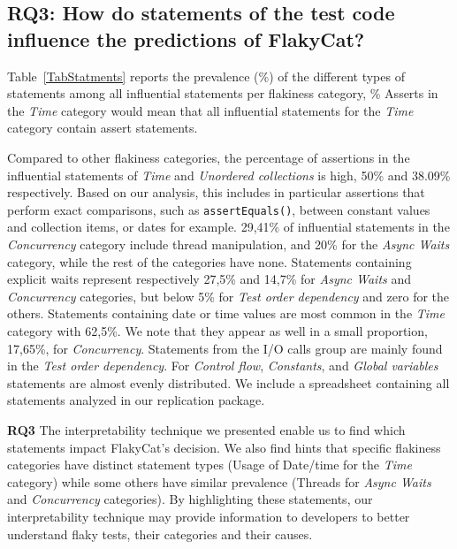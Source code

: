 \subsection{RQ3: How do statements of the test code influence the
predictions of FlakyCat?}

Table~\ref{TabStatments} reports the prevalence (\%) of the different types of statements among all influential statements per flakiness category, \% Asserts in the \textit{Time} category would mean that all influential statements for the \textit{Time} category contain assert statements. 

Compared to other flakiness categories, the percentage of assertions in the influential statements of \textit{Time} and \textit{Unordered collections} is high, 50\% and 38.09\% respectively. Based on our analysis, this includes in particular assertions that perform exact comparisons, such as \texttt{assertEquals()}, between constant values and collection items, or dates for example. 
29,41\% of influential statements in the \textit{Concurrency} category include thread manipulation, and 20\% for the \textit{Async Waits} category, while the rest of the categories have none. 
Statements containing explicit waits represent respectively 27,5\% and 14,7\% for \textit{Async Waits} and \textit{Concurrency} categories, but below 5\% for \textit{Test order dependency} and zero for the others. Statements containing date or time values are most common in the \textit{Time} category with 62,5\%. We note that they appear as well in a small proportion, 17,65\%, for \textit{Concurrency}. Statements from the I/O calls group are mainly found in the \textit{Test order dependency}.
For \textit{Control flow}, \textit{Constants}, and \textit{Global variables} statements are almost evenly distributed. We include a spreadsheet containing all statements analyzed in our replication package. 


\vspace{2mm}
\begin{tcolorbox}
\textbf{RQ3} The interpretability technique we presented enable us to find which statements impact FlakyCat's decision. We also find hints that specific flakiness categories have distinct statement types (\eg Usage of Date/time for the \textit{Time} category) while some others have similar prevalence (\eg Threads for \textit{Async Waits} and \textit{Concurrency} categories).
By highlighting these statements, our interpretability technique may provide information to developers to better understand flaky tests, their categories and their causes.
\end{tcolorbox}

